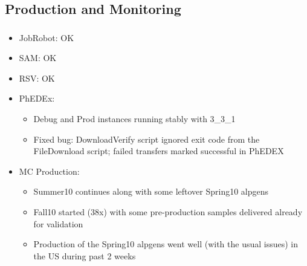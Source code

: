 \documentclass{beamer}
\begin{document}
\subsection{Production and Monitoring}
\begin{frame}
\frametitle{}

\begin{itemize}
    \item JobRobot: OK
    \item SAM: OK
    \item RSV: OK
    \item PhEDEx:
    \begin{itemize}
        \item Debug and Prod instances running stably with 3\_3\_1
        \item Fixed bug: DownloadVerify script ignored exit code from the FileDownload script; failed transfers marked successful in PhEDEX
    \end{itemize}
    \item MC Production:
    \begin{itemize}
        \item Summer10 continues along with some leftover Spring10 alpgens
        \item Fall10 started (38x) with some pre-production samples delivered already for validation
        \item Production of the Spring10 alpgens went well (with the usual issues) in the US during past 2 weeks

    \end{itemize}
\end{itemize}
\end{frame}
\end{document}
